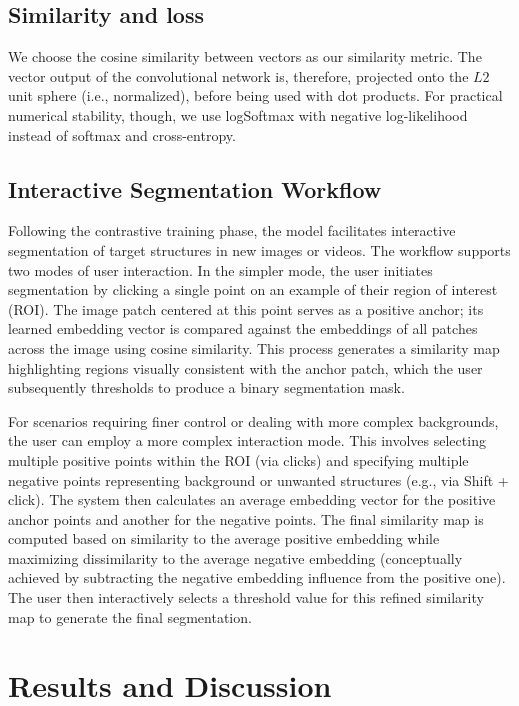 \documentclass[./dissertation.tex]{subfiles}
\begin{document}
\subsection{Similarity and loss}
We choose the cosine similarity between vectors as our similarity metric. The vector output of the convolutional network is, therefore, projected onto the \(L2\) unit sphere (i.e., normalized), before being used with dot products. For practical numerical stability, though, we use logSoftmax with negative log-likelihood instead of softmax and cross-entropy.

\subsection{Interactive Segmentation Workflow}
Following the contrastive training phase, the model facilitates interactive segmentation of target structures in new images or videos. The workflow supports two modes of user interaction. In the simpler mode, the user initiates segmentation by clicking a single point on an example of their region of interest (ROI). The image patch centered at this point serves as a positive anchor; its learned embedding vector is compared against the embeddings of all patches across the image using cosine similarity. This process generates a similarity map highlighting regions visually consistent with the anchor patch, which the user subsequently thresholds to produce a binary segmentation mask. 

For scenarios requiring finer control or dealing with more complex backgrounds, the user can employ a more complex interaction mode. This involves selecting multiple positive points within the ROI (via clicks) and specifying multiple negative points representing background or unwanted structures (e.g., via Shift + click). The system then calculates an average embedding vector for the positive anchor points and another for the negative points. The final similarity map is computed based on similarity to the average positive embedding while maximizing dissimilarity to the average negative embedding (conceptually achieved by subtracting the negative embedding influence from the positive one). The user then interactively selects a threshold value for this refined similarity map to generate the final segmentation.


\label{cc:Results and Discussion}
\section{Results and Discussion}
\end{document}
